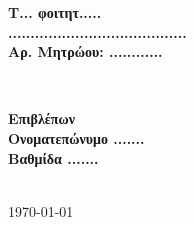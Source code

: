 \documentclass[twoside, a4paper, 11pt]{article}
\begin{document}
\begin{titlepage}
    \begin{minipage}{0.45\textwidth}
    \begin{flushleft} \large
    \textbf{Τ... φοιτητ.....}
    \\\textbf{........................................} %
    \\\textbf{Αρ. Μητρώου: ............}
    \end{flushleft}
    \end{minipage}
    ~
    \begin{minipage}{0.45\textwidth}
    \begin{flushright} \large
    \textbf{Επιβλέπων}
    \\\textbf{Ονοματεπώνυμο .......}
    \\\textbf{Βαθμίδα .......}
    \end{flushright}
    \end{minipage}\\[5cm]

{\large {}\today}\\[2cm]

\end{titlepage}

\clearpage

\thispagestyle{empty}
\end{document}
